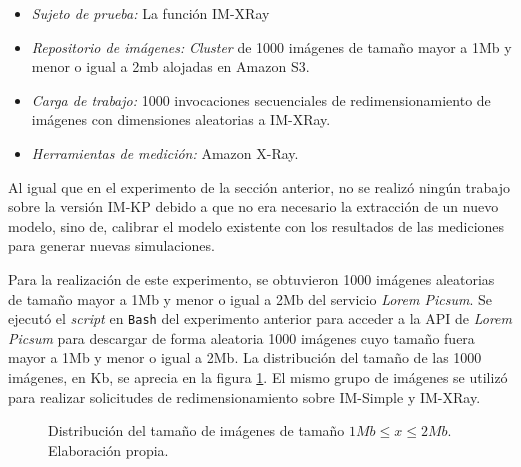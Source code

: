\begin{itemize}
    \item \emph{Sujeto de prueba:} La función IM-XRay
    \item \emph{Repositorio de imágenes:} \emph{Cluster} de 1000 imágenes de tamaño mayor a 1Mb y menor o igual a 2mb alojadas en Amazon S3.     
    \item \emph{Carga de trabajo:} 1000 invocaciones secuenciales de redimensionamiento de imágenes con dimensiones aleatorias a IM-XRay.
    \item \emph{Herramientas de medición:} Amazon X-Ray.
\end{itemize}

Al igual que en el experimento de la sección anterior, no se realizó ningún trabajo sobre la versión IM-KP debido a que no era necesario la extracción de un nuevo modelo, sino de, calibrar el modelo existente con los resultados de las mediciones para generar nuevas simulaciones.

Para la realización de este experimento, se obtuvieron 1000 imágenes aleatorias de tamaño mayor a 1Mb y menor o igual a 2Mb del servicio \emph{Lorem Picsum}. Se ejecutó el \emph{script} en \texttt{Bash} del experimento anterior para acceder a la API de \emph{Lorem Picsum} para descargar de forma aleatoria 1000 imágenes cuyo tamaño fuera mayor a 1Mb y menor o igual a 2Mb. La distribución del tamaño de las 1000 imágenes, en Kb, se aprecia en la figura \ref{fig:distribucion-tamanno-imagenes-hasta-2mb}. El mismo grupo de imágenes se utilizó para realizar solicitudes de redimensionamiento sobre IM-Simple y IM-XRay.

\begin{figure}
\hspace{-1.0cm}
\caption[\hspace{0.2cm} Distribución del tamaño de imágenes de tamaño $1Mb \leq x \leq 2Mb$]{Distribución del tamaño de imágenes de tamaño $1Mb \leq x \leq 2Mb$. Elaboración propia.}
\label{fig:distribucion-tamanno-imagenes-hasta-2mb}
\end{figure}

